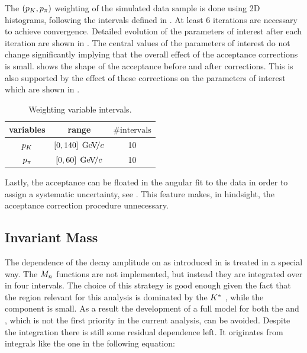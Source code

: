 The $(p_K,p_\pi)$ weighting of the simulated data sample is done using 2D histograms, following the intervals defined in .
At least 6 iterations are necessary to achieve convergence. Detailed evolution of the parameters of interest after each iteration are shown in
. The central values of the parameters of interest do not change significantly implying that the overall effect of the
acceptance corrections is small.  shows the shape of the acceptance before and after corrections.
This is also supported by the effect of these corrections on the parameters of interest which are shown in .

\begin{table}[!h]
  \center
  \begin{tabular}{c c c}
    \hline
     variables & range & $\# \text{intervals}$ \\
    \hline
    $p_K$    &  $[0,140] \; {\mathrm{\,Ge\kern -0.1em V\!/}c}$  & 10      \\
    $p_\pi$    &  $[0,60]  \; {\mathrm{\,Ge\kern -0.1em V\!/}c}$  & 10      \\
    \hline
  \end{tabular}
  \caption{\small Weighting variable intervals.}
  \label{angAccBinning}
\end{table}

Lastly, the acceptance can be floated in the angular fit to the data in order to assign a systematic uncertainty, see .
This feature makes, in hindsight, the acceptance correction procedure unnecessary.


\subsection{\Kpi Invariant Mass}
\label{Kpi_Invariant_mass}

The dependence of the \BJpsiKpi decay amplitude on \mkpi as introduced in  is treated in a special way.
The $M_{n}$ functions are not implemented, but instead they are integrated over in four intervals. The choice of this strategy
is good enough given the fact that the \mkpi region relevant for this analysis is dominated by the $K^*$ \pwave,
while the \swave component is small. As a result the development of a full model for both the \pwave and \swave, which is not the
first priority in the current analysis, can be avoided. Despite the \mkpi integration there is still some residual dependence left.
It originates from integrals like the one in the following equation:

